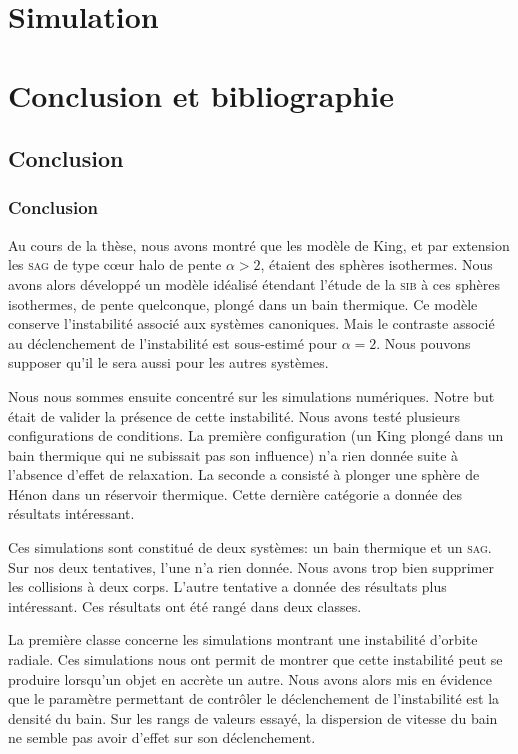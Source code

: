 \documentclass[a4paper,11pt,twoside,openright]{report}
\renewcommand{\(}{\ensuremath{\left(}}
\renewcommand{\)}{\ensuremath{\right)}}
\begin{document}
	\part{Simulation}
		

	\part*{Conclusion et bibliographie}
		\chapter{Conclusion}

		\section{Conclusion}

			Au cours de la thèse, nous avons montré que les modèle de King, et par extension les \textsc{sag} de type cœur halo de pente
			$\alpha>2$, étaient des sphères isothermes. Nous avons alors développé un modèle idéalisé étendant l'étude de la \textsc{sib}
			à ces sphères isothermes, de pente quelconque, plongé dans un bain thermique. Ce modèle conserve l'instabilité associé aux systèmes
			canoniques. Mais le contraste associé au déclenchement de l'instabilité est sous-estimé pour $\alpha=2$. Nous pouvons supposer
			qu'il le sera aussi pour les autres systèmes.

			Nous nous sommes ensuite concentré sur les simulations numériques. Notre but était de valider la présence de cette
			instabilité. Nous avons testé plusieurs configurations de conditions. La première configuration (un King plongé dans un bain
			thermique qui ne subissait pas son influence) n'a rien donnée suite à l'absence d'effet de relaxation. La seconde a consisté à
			plonger une sphère de Hénon dans un réservoir thermique. Cette dernière catégorie a donnée des résultats intéressant.

			Ces simulations sont constitué de deux systèmes: un bain thermique et un \textsc{sag}. Sur nos deux tentatives,
			l'une n'a rien donnée. Nous avons trop bien supprimer les collisions à deux corps. L'autre tentative a donnée des résultats
			plus intéressant. Ces résultats ont été rangé dans deux classes.

			La première classe concerne les simulations montrant une instabilité d'orbite radiale. Ces simulations nous ont permit
			de montrer que cette instabilité peut se produire lorsqu'un objet en accrète un autre. Nous avons alors mis en évidence que le
			paramètre permettant de contrôler le déclenchement de l'instabilité est la densité du bain. Sur les rangs de valeurs essayé,
			la dispersion de vitesse du bain ne semble pas avoir d'effet sur son déclenchement.
\end{document}
